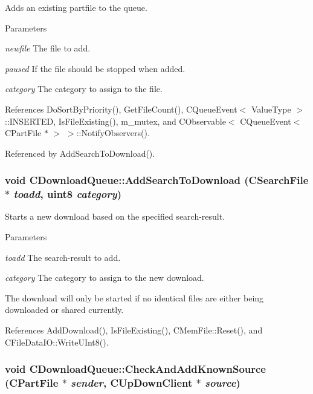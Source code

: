 Adds an existing partfile to the queue. 
\begin{DoxyParams}{Parameters}
\item[{\em newfile}]The file to add. \item[{\em paused}]If the file should be stopped when added. \item[{\em category}]The category to assign to the file. \end{DoxyParams}


References DoSortByPriority(), GetFileCount(), CQueueEvent$<$ ValueType $>$::INSERTED, IsFileExisting(), m\_\-mutex, and CObservable$<$ CQueueEvent$<$ CPartFile $\ast$ $>$ $>$::NotifyObservers().

Referenced by AddSearchToDownload().
\subsubsection[{AddSearchToDownload}]{\setlength{\rightskip}{0pt plus 5cm}void CDownloadQueue::AddSearchToDownload ({\bf CSearchFile} $\ast$ {\em toadd}, \/  uint8 {\em category})}\label{classCDownloadQueue_af31a136ab20fdf1b4a16009f8b6283f6}


Starts a new download based on the specified search-\/result. 
\begin{DoxyParams}{Parameters}
\item[{\em toadd}]The search-\/result to add. \item[{\em category}]The category to assign to the new download.\end{DoxyParams}
The download will only be started if no identical files are either being downloaded or shared currently. 

References AddDownload(), IsFileExisting(), CMemFile::Reset(), and CFileDataIO::WriteUInt8().
\subsubsection[{CheckAndAddKnownSource}]{\setlength{\rightskip}{0pt plus 5cm}void CDownloadQueue::CheckAndAddKnownSource ({\bf CPartFile} $\ast$ {\em sender}, \/  {\bf CUpDownClient} $\ast$ {\em source})}\label{classCDownloadQueue_abc3acf6acf68639bf30972616dbfdba0}


